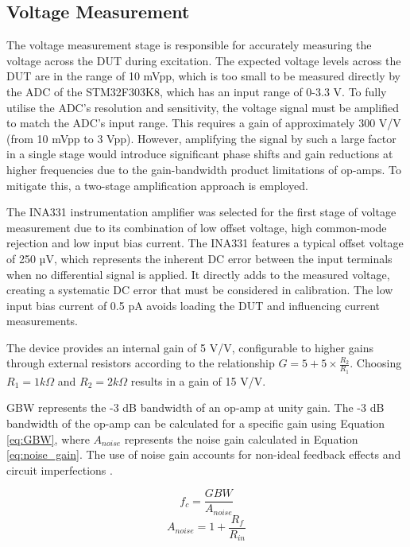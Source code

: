 \subsection{Voltage Measurement}
The voltage measurement stage is responsible for accurately measuring the voltage across the \ac{DUT} during excitation. The expected voltage levels across the \ac{DUT} are in the range of 10 mVpp, which is too small to be measured directly by the \ac{ADC} of the STM32F303K8, which has an input range of 0-3.3 V. To fully utilise the \ac{ADC}'s resolution and sensitivity, the voltage signal must be amplified to match the \ac{ADC}'s input range. This requires a gain of approximately 300 V/V (from 10 mVpp to 3 Vpp). However, amplifying the signal by such a large factor in a single stage would introduce significant phase shifts and gain reductions at higher frequencies due to the gain-bandwidth product limitations of op-amps. To mitigate this, a two-stage amplification approach is employed.

The INA331 instrumentation amplifier was selected for the first stage of voltage measurement due to its combination of low offset voltage, high common-mode rejection and low input bias current. The INA331 features a typical offset voltage of 250 µV, which represents the inherent DC error between the input terminals when no differential signal is applied. It directly adds to the measured voltage, creating a systematic DC error that must be considered in calibration. The low input bias current of 0.5 pA avoids loading the \ac{DUT} and influencing current measurements. 

The device provides an internal gain of 5 V/V, configurable to higher gains through external resistors according to the relationship $G = 5 + 5\times \frac{R_2}{R_1}$. Choosing $R_1=1 k\Omega$ and $R_2=2 k\Omega$ results in a gain of 15 V/V. 

\Ac{GBW} represents the -3 dB bandwidth of an op-amp at unity gain. The -3 dB bandwidth of the op-amp can be calculated for a specific gain using Equation \ref{eq:GBW}, where $A_{noise}$ represents the noise gain calculated in Equation \ref{eq:noise_gain}. The use of noise gain accounts for non-ideal feedback effects and circuit imperfections \cite{fiore53GainBandwidthProduct2018}.

\begin{equation}
    f_c = \frac{GBW}{A_{noise}}
    \label{eq:GBW}
\end{equation}
\begin{equation}
    A_{noise} = 1 + \frac{R_f}{R_{in}}
    \label{eq:noise_gain}
\end{equation}

